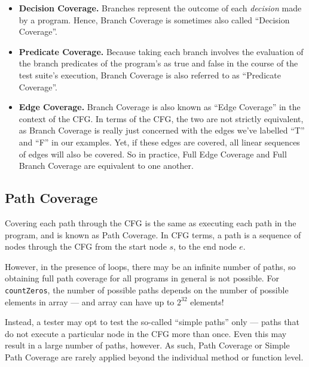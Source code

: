 \begin{itemize}

    \item {\bf Decision Coverage.} Branches represent the outcome of each {\it
    decision} made by a program. Hence, Branch Coverage is sometimes also called
    ``Decision Coverage''.

    \item {\bf Predicate Coverage.} Because taking each branch involves the
    evaluation of the branch predicates of the program's as true and false in
    the course of the test suite's execution, Branch Coverage is also referred
    to as ``Predicate Coverage''.

    \item {\bf Edge Coverage.} Branch Coverage is also known as ``Edge
    Coverage'' in the context of the CFG. In terms of the CFG, the two are not
    strictly equivalent, as Branch Coverage is really just concerned with the
    edges we've labelled ``T'' and ``F'' in our examples. Yet, if these edges
    are covered, all linear sequences of edges will also be covered. So in
    practice, Full Edge Coverage and Full Branch Coverage are equivalent to one
    another.

\end{itemize}


\subsection{Path Coverage} 

Covering each path through the CFG is the same as executing each path in the
program, and is known as Path Coverage. In CFG terms, a path is a sequence of
nodes through the CFG from the start node $s$, to the end node $e$. 


However, in the presence of loops, there may be an infinite number of paths, so
obtaining full path coverage for all programs in general is not possible. For
{\tt countZeros}, the number of possible paths depends on the number of possible
elements in array --- and array can have up to $2^{32}$ elements!

Instead, a tester may opt to test the so-called ``simple paths'' only --- paths
that do not execute a particular node in the CFG more than once. Even this may
result in a large number of paths, however. As such, Path Coverage or Simple
Path Coverage are rarely applied beyond the individual method or function level.

